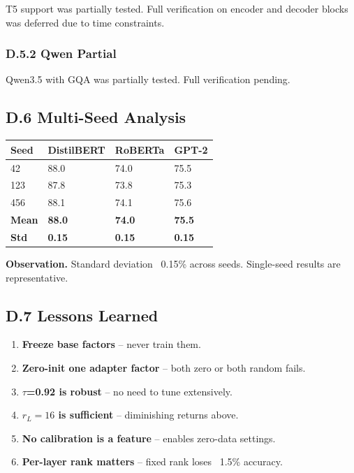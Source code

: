T5 support was partially tested. Full verification on encoder and decoder 
blocks was deferred due to time constraints.

\subsubsection{D.5.2 Qwen Partial}

Qwen3.5 with GQA was partially tested. Full verification pending.

\subsection{D.6 Multi-Seed Analysis}

\begin{table}[H]
\centering
\small
\begin{tabular}{llll}
\toprule
\textbf{Seed} & \textbf{DistilBERT} & \textbf{RoBERTa} & \textbf{GPT-2} \\
\midrule
42 & 88.0 & 74.0 & 75.5 \\
123 & 87.8 & 73.8 & 75.3 \\
456 & 88.1 & 74.1 & 75.6 \\
\textbf{Mean} & \textbf{88.0} & \textbf{74.0} & \textbf{75.5} \\
\textbf{Std} & \textbf{0.15} & \textbf{0.15} & \textbf{0.15} \\
\bottomrule
\end{tabular}
\end{table}

\textbf{Observation.} Standard deviation ~0.15\% across seeds. Single-seed results 
are representative.

\subsection{D.7 Lessons Learned}

\begin{enumerate}
\item \textbf{Freeze base factors} -- never train them.
\item \textbf{Zero-init one adapter factor} -- both zero or both random fails.
\item \textbf{$\tau$=0.92 is robust} -- no need to tune extensively.
\item \textbf{$r_L=16$ is sufficient} -- diminishing returns above.
\item \textbf{No calibration is a feature} -- enables zero-data settings.
\item \textbf{Per-layer rank matters} -- fixed rank loses ~1.5\% accuracy.

\end{enumerate}
